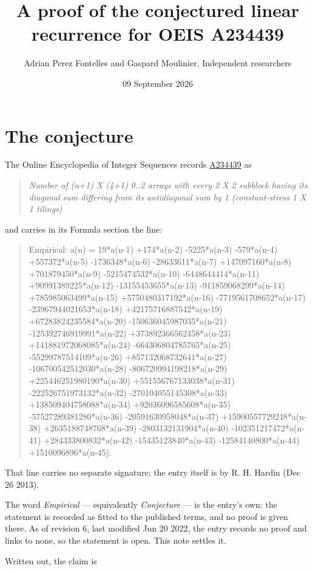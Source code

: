 \documentclass[11pt]{article}
\title{A proof of the conjectured linear recurrence for OEIS A234439}
\author{Adrian Perez Fontelles and Gaspard Moulinier, Independent researchers}
\date{09 September 2026}
\theoremstyle{definition}
\begin{document}
\maketitle
\section{The conjecture}

The Online Encyclopedia of Integer Sequences records \href{https://oeis.org/A234439}{A234439} as

\begin{quote}\itshape Number of (n+1) X (4+1) 0..2 arrays with every 2 X 2 subblock having its diagonal sum differing from its antidiagonal sum by 1 (constant-stress 1 X 1 tilings)\end{quote}

and carries in its Formula section the line:

\begin{quote}\ttfamily Empirical: a(n) = 19*a(n-1) +174*a(n-2) -5225*a(n-3) -579*a(n-4) +557372*a(n-5) -1736348*a(n-6) -28633611*a(n-7) +147097160*a(n-8) +701879450*a(n-9) -5215474532*a(n-10) -6448644414*a(n-11) +90991389225*a(n-12) -13155453655*a(n-13) -911859068299*a(n-14) +785985063499*a(n-15) +5750480317192*a(n-16) -7719561708652*a(n-17) -23967944021653*a(n-18) +42175716887542*a(n-19) +67283824235584*a(n-20) -150636045987035*a(n-21) -125392746919991*a(n-22) +373892366562458*a(n-23) +141881972068085*a(n-24) -664306804785765*a(n-25) -55299787514109*a(n-26) +857132068732641*a(n-27) -106700542512030*a(n-28) -806720994198218*a(n-29) +225446251980190*a(n-30) +551556767133038*a(n-31) -222526751973132*a(n-32) -270104055145308*a(n-33) +138509404758088*a(n-34) +92036096585608*a(n-35) -57527289381280*a(n-36) -20591630958048*a(n-37) +15900557729248*a(n-38) +2635188748768*a(n-39) -2803132131904*a(n-40) -102351217472*a(n-41) +284333800832*a(n-42) -15435123840*a(n-43) -12584140800*a(n-44) +1510096896*a(n-45).\end{quote}

That line carries no separate signature; the entry itself is by R. H. Hardin (Dec 26 2013).

The word {\itshape Empirical} --- equivalently {\itshape Conjecture} --- is the entry's own: the statement is recorded as fitted to the published terms, and no proof is given there. As of revision 6, last modified Jun 20 2022, the entry records no proof and links to none, so the statement is open. This note settles it.

Written out, the claim is
\end{document}
